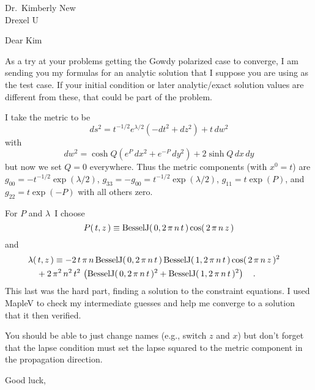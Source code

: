 %
%
%
%
%
%
\signature{Charlie
}




\begin{letter}{%
Dr.\ Kimberly New\\
Drexel U
}


\opening{Dear Kim}

     As a try at your problems getting the Gowdy polarized case to
converge, I am sending you my formulas for an analytic solution that
I suppose you are using as the test case.  If your initial condition
or later analytic/exact solution values are different from these,
that could be part of the problem.

    I take the metric to be 
        \begin{equation}\label{eq-gdyt}
    ds^2 = t^{-1/2} e^{\lambda/2}(- dt^2 + dz^2)
           +t\, dw^2
    \end{equation}
with
    \begin{equation}\label{eq-cag}
    dw^2  =  \cosh Q (e^P\,dx^2 + e^{-P}\,dy^2) 
                + 2 \sinh Q \,dx\,dy
    \end{equation}
    but now we set $Q=0$ everywhere.
    Thus the metric components (with $x^0 = t$) are
    $g_{00} = -t^{-1/2} \exp{(\lambda/2)}$, 
    $g_{33} = -g_{00} = t^{-1/2} \exp{(\lambda/2)}$,
    $g_{11} = t \exp{(P)}$, and 
    $g_{22} = t \exp{(-P)}$
    with all others zero.

    For $P$ and $\lambda$\, I choose
    \begin{equation}
{P}(\,{t}, {z}\,) \equiv {\rm BesselJ}(\,0, 2\,{ \pi}\,{
n}\,{t}\,)\,{\rm cos}(\,2\,{ \pi}\,{n}\,{z}\,)
    \end{equation}
    and
    \begin{eqnarray}
\lefteqn{{\lambda}(\,{t}, {z}\,) \equiv  - 2\,{t}\,{ \pi}\,{n}
\,{\rm BesselJ}(\,0, 2\,{ \pi}\,{n}\,{t}\,)\,{\rm BesselJ}(\,1, 2
\,{ \pi}\,{n}\,{t}\,)\,{\rm cos}(\,2\,{ \pi}\,{n}\,{z}\,)^{2}} 
    \nonumber\\
 & & \mbox{} + 2\,{ \pi}^{2}\,{n}^{2}\,{t}^{2}\, \left( \! \,
{\rm BesselJ}(\,0, 2\,{ \pi}\,{n}\,{t}\,)^{2} + {\rm BesselJ}(\,1
, 2\,{ \pi}\,{n}\,{t}\,)^{2}\, \!  \right) 
\quad . \mbox{\hspace{40pt}}
    \end{eqnarray}
    This last was the hard part, finding a solution to the constraint
equations.  I used MapleV to check my intermediate guesses and help
me converge to a solution that it then verified.

    You should be able to just change names (e.g., switch $z$ and
$x$) but don't forget that the lapse condition must set the lapse
squared to the metric component in the propagation direction.

    \closing{%
Good luck,
    }

\end{letter}



